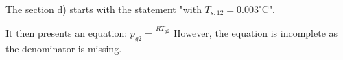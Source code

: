 The section d) starts with the statement "with \( T_{s,12} = 0.003^\circ \text{C} \)".

It then presents an equation:
\( p_{g2} = \frac{R T_{g2}}{} \)
However, the equation is incomplete as the denominator is missing.